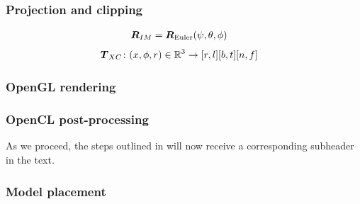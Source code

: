 \subsubsection{Projection and clipping}

\begin{align}
\dvec{R}_{IM} &= \dvec{R}_{\mathrm{Euler}}(\psi,\theta,\phi)\label{eq_R_IM}
\end{align}
\begin{align}
\boldsymbol{T}_{XC}&\colon (x,\phi,r)\in\mathbb{R}^3 \to [r,l][b,t][n,f]
\end{align}

\subsubsection{OpenGL rendering}



\subsubsection{OpenCL post-processing}


%
























As we proceed, the steps outlined in  will now receive a corresponding subheader in the text.

\subsubsection{Model placement}

